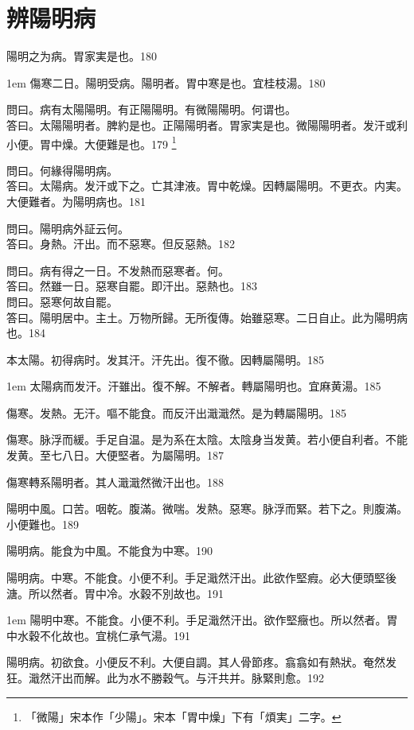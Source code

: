 \chapter{辨陽明病}

陽明之为病。胃家実是也。180

\hangindent 1em
傷寒二日。陽明受病。陽明者。胃中寒是也。宜桂枝湯。{\gaoben}180

問曰。病有太陽陽明。有正陽陽明。有微陽陽明。何谓也。\\
答曰。太陽陽明者。脾約是也。正陽陽明者。胃家実是也。微陽陽明者。发汗或利小便。胃中燥。大便難是也。179
	\footnote{「微陽」宋本作「少陽」。宋本「胃中燥」下有「煩実」二字。}

問曰。何緣得陽明病。\\
答曰。太陽病。发汗或下之。亡其津液。胃中乾燥。因轉屬陽明。不更衣。内実。大便難者。为陽明病也。181

問曰。陽明病外証云何。\\
答曰。身熱。汗出。而不惡寒。{\khaaitp 但}反惡熱。182

問曰。病有得之一日。不发熱而惡寒者。何。\\
答曰。然雖一日。惡寒自罷。即汗出。惡熱也。183\\
問曰。惡寒何故自罷。\\
答曰。陽明居中。主土。万物所歸。无所復傳。始雖惡寒。二日自止。此为陽明病也。184

本太陽。初得病时。发其汗。汗先出{\khaaitp 。復}不徹。因轉屬陽明。185

\hangindent 1em
太陽病而发汗。汗雖出。復不解。不解者。轉屬陽明也。宜麻黄湯。{\gaoben}185

傷寒。发熱。无汗。嘔不能食。而反汗出濈濈然。是为轉屬陽明。185

傷寒。脉浮而緩。手足自温。是为系在太陰。太陰{\khaaitp 身}当发黄。若小便自利者。不能发黄。至七八日。大便堅者。为屬陽明。187

傷寒轉系陽明者。其人濈濈然微汗出也。188

陽明中風。口苦。咽乾。腹滿。微喘。发熱。惡寒。脉浮而緊。若下之。則腹滿。小便難也。189

陽明病。能食为中風。不能食为中寒。190

陽明{\khaaitp 病。}中寒。不能食。小便不利。手足濈然汗出。此欲作堅瘕。必大便頭堅後溏。所以然者。胃中冷。水穀不別故也。191

\hangindent 1em
陽明中寒。不能食。小便不利。手足濈然汗出。欲作堅癥也。所以然者。胃中水穀不化故也。宜桃仁承气湯。{\gaoben}191

陽明病。初欲食。小便反不利。大便自調。其人骨節疼。翕翕如有熱狀。奄然发狂。濈然汗出而解。此为水不勝穀气。与汗共并。脉緊則愈。192

